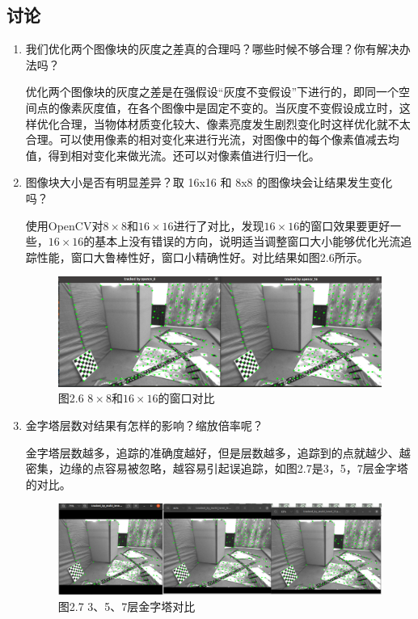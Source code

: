 \documentclass[40pt,a4paper，UTF8]{ctexart}
\numberwithin{equation}{section}
\begin{document}
\subsection{讨论}
\begin{enumerate}
\item 我们优化两个图像块的灰度之差真的合理吗？哪些时候不够合理？你有解决办法吗？

优化两个图像块的灰度之差是在强假设“灰度不变假设”下进行的，即同一个空间点的像素灰度值，在各个图像中是固定不变的。当灰度不变假设成立时，这样优化合理，当物体材质变化较大、像素亮度发生剧烈变化时这样优化就不太合理。可以使用像素的相对变化来进行光流，对图像中的每个像素值减去均值，得到相对变化来做光流。还可以对像素值进行归一化。

\item 图像块大小是否有明显差异？取 16x16 和 8x8 的图像块会让结果发生变化吗？

使用OpenCV对$8\times 8$和$16\times 16$进行了对比，发现$16\times 16$的窗口效果要更好一些，$16\times 16$的基本上没有错误的方向，说明适当调整窗口大小能够优化光流追踪性能，窗口大鲁棒性好，窗口小精确性好。对比结果如图2.6所示。

\begin{figure}[H]
\centering
\includegraphics[width=4.8in]{ch6_2_7.png} {图2.6 $8\times 8$和$16\times 16$的窗口对比}
\end{figure}

\item 金字塔层数对结果有怎样的影响？缩放倍率呢？

金字塔层数越多，追踪的准确度越好，但是层数越多，追踪到的点就越少、越密集，边缘的点容易被忽略，越容易引起误追踪，如图2.7是3，5，7层金字塔的对比。

\begin{figure}[H]
\centering
\includegraphics[width=4.8in]{ch6_2_8.png} {图2.7  3、5、7层金字塔对比}
\end{figure}



\end{enumerate}
\end{document}
